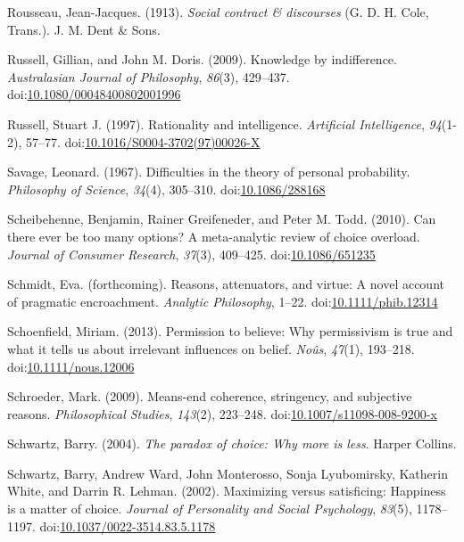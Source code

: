 \documentclass[
  12pt,
  letterpaper,
]{scrbook}
\newlength{\cslhangindent}
\newenvironment{CSLReferences}[2] %
 {\begin{list}{}{%
  \setlength{\itemindent}{0pt}
  \setlength{\leftmargin}{0pt}
  \setlength{\parsep}{0pt}
  \ifodd #1
   \setlength{\leftmargin}{\cslhangindent}
   \setlength{\itemindent}{-1\cslhangindent}
  \fi
  \setlength{\itemsep}{#2\baselineskip}}}
 {\end{list}}
\begin{document}
\begin{CSLReferences}{1}{0}
Rousseau, Jean-Jacques. (1913). \emph{Social contract \& discourses} (G.
D. H. Cole, Trans.). J. M. Dent \& Sons.

Russell, Gillian, and John M. Doris. (2009). Knowledge by indifference.
\emph{Australasian Journal of Philosophy}, \emph{86}(3), 429--437.
doi:\href{https://doi.org/10.1080/00048400802001996}{10.1080/00048400802001996}

Russell, Stuart J. (1997). Rationality and intelligence.
\emph{Artificial Intelligence}, \emph{94}(1-2), 57--77.
doi:\href{https://doi.org/10.1016/S0004-3702(97)00026-X}{10.1016/S0004-3702(97)00026-X}

Savage, Leonard. (1967). Difficulties in the theory of personal
probability. \emph{Philosophy of Science}, \emph{34}(4), 305--310.
doi:\href{https://doi.org/10.1086/288168}{10.1086/288168}

Scheibehenne, Benjamin, Rainer Greifeneder, and Peter M. Todd. (2010).
Can there ever be too many options? A meta-analytic review of choice
overload. \emph{Journal of Consumer Research}, \emph{37}(3), 409--425.
doi:\href{https://doi.org/10.1086/651235}{10.1086/651235}

Schmidt, Eva. (forthcoming). Reasons, attenuators, and virtue: A novel
account of pragmatic encroachment. \emph{Analytic Philosophy}, 1--22.
doi:\href{https://doi.org/10.1111/phib.12314}{10.1111/phib.12314}

Schoenfield, Miriam. (2013). Permission to believe: Why permissivism is
true and what it tells us about irrelevant influences on belief.
\emph{No{û}s}, \emph{47}(1), 193--218.
doi:\href{https://doi.org/10.1111/nous.12006}{10.1111/nous.12006}

Schroeder, Mark. (2009). Means-end coherence, stringency, and subjective
reasons. \emph{Philosophical Studies}, \emph{143}(2), 223--248.
doi:\href{https://doi.org/10.1007/s11098-008-9200-x}{10.1007/s11098-008-9200-x}

Schwartz, Barry. (2004). \emph{The paradox of choice: Why more is less}.
Harper Collins.

Schwartz, Barry, Andrew Ward, John Monterosso, Sonja Lyubomirsky,
Katherin White, and Darrin R. Lehman. (2002). Maximizing versus
satisficing: Happiness is a matter of choice. \emph{Journal of
Personality and Social Psychology}, \emph{83}(5), 1178--1197.
doi:\href{https://doi.org/10.1037/0022-3514.83.5.1178}{10.1037/0022-3514.83.5.1178}


\end{CSLReferences}
\end{document}
